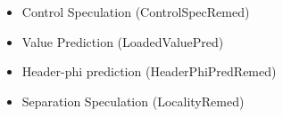 \begin{itemize}
    \item Control Speculation (ControlSpecRemed)

    \item Value Prediction (LoadedValuePred)

    \item Header-phi prediction (HeaderPhiPredRemed)

    \item Separation Speculation (LocalityRemed)








\end{itemize}
